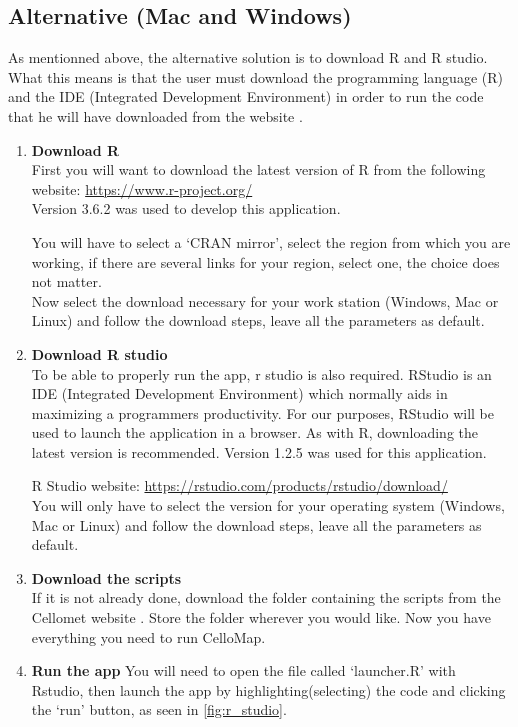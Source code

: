 \documentclass[11pt]{article}
\begin{document}
\subsection{Alternative (Mac and Windows)\label{alter_install}}
As mentionned above, the alternative solution is to download R and R studio. What this means is that the user must download the programming language (R) and the \acrshort{IDE} (Integrated Development Environment) in order to run the code that he will have downloaded from the website \cite{Cellomet}.
\begin{enumerate}
\item \textbf{Download R}\\
First you will want to download the latest version of R from the following website: \url{https://www.r-project.org/}
\\Version 3.6.2 was used to develop this application.

You will have to select a `CRAN mirror', select the region from which you are working, if there are several links for your region, select one, the choice does not matter.\\
Now select the download necessary for your work station (Windows, Mac or Linux) and follow the download steps, leave all the parameters as default.
\item \textbf{Download R studio}\\
To be able to properly run the app, r studio is also required. RStudio is an IDE (Integrated Development Environment) which normally aids in maximizing a programmers productivity. For our purposes, RStudio will be used to launch the application in a browser. As with R, downloading the latest version is recommended. Version 1.2.5 was used for this application.

R Studio website: \url{https://rstudio.com/products/rstudio/download/}
\\

You will only have to select the version for your operating system (Windows, Mac or Linux) and follow the download steps, leave all the parameters as default.
\item \textbf{Download the scripts}\\
If it is not already done, download the folder containing the scripts from the Cellomet website \cite{Cellomet}.
Store the folder wherever you would like. Now you have everything you need to run CelloMap.

\item \textbf{Run the app}
You will need to open the file called `launcher.R' with Rstudio, then launch the app by highlighting(selecting) the code and clicking the `run' button, as seen in \autoref{fig:r_studio}.


\end{enumerate}
\end{document}
